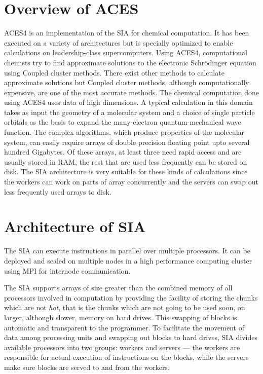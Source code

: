 \section{Overview of ACES}
ACES4 is an implementation of the SIA for chemical computation. It has been executed
on a variety of architectures but is specially optimized to enable
calculations on leadership-class supercomputers. Using ACES4, computational chemists
try to find approximate solutions to the electronic Schrödinger equation using Coupled cluster
methods. There exist other methods to calculate approximate solutions but Coupled
cluster methods, although computationally expensive, are one of the most accurate methods.
The chemical computation done using ACES4 uses data of high dimensions. A typical calculation in this domain
takes as input the geometry of a molecular system and a choice of single
particle orbitals as the basis to expand the many-electron quantum-mechanical wave
function. The complex algorithms, which produce properties of the molecular
system, can easily require arrays of double precision floating point upto
several hundred Gigabytes. Of these arrays, at least three need rapid access and
are usually stored in RAM, the rest that are used less frequently can be stored
on disk. The SIA architecture is very suitable for these kinds of calculations since
the workers can work on parts of array concurrently and the servers can swap out
less frequently used arrays to disk.

\section{Architecture of SIA}\label{siaarch}
The SIA can execute instructions in parallel over multiple processors. It can be
deployed and scaled on multiple nodes in a high performance computing cluster
using MPI for internode communication.

The SIA supports arrays of size greater than the combined memory of all processors
involved in computation by providing the facility of storing the chunks which are
not \textit{hot}, that is the chunks which are not going to be used soon, on
larger, although slower, memory on hard drives. This swapping of blocks is automatic
and transparent to the programmer. To facilitate the movement of data among
processing units and swapping out blocks to hard drives, SIA divides available
processors into two groups: workers and servers --- the workers are responsible for
actual execution of instructions on the blocks, while the servers make sure blocks
are served to and from the workers.

